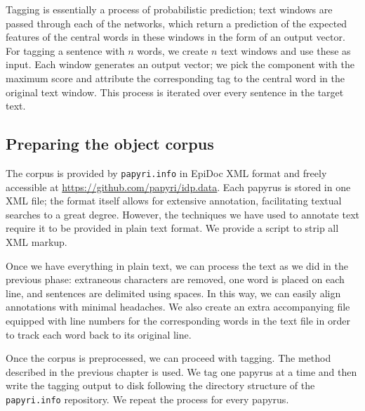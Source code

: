 Tagging is essentially a process of probabilistic prediction; text
windows are passed through each of the networks, which return a
prediction of the expected features of the central words in these
windows in the form of an output vector. For tagging a sentence with
$n$ words, we create $n$ text windows and use these as input. Each
window generates an output vector; we pick the component with the
maximum score and attribute the corresponding tag to the central word
in the original text window. This process is iterated over every
sentence in the target text. 

\subsection{Preparing the object corpus}
\label{sec:createmodel}
The corpus is provided by \texttt{papyri.info} in EpiDoc XML format
and freely accessible at
\url{https://github.com/papyri/idp.data}. Each papyrus is stored in
one XML file; the format itself allows for extensive annotation,
facilitating textual searches to a great degree. However, the
techniques we have used to annotate text require it to be provided in
plain text format. We provide a script to strip all XML markup.

Once we have everything in plain text, we can process the text as we
did in the previous phase: extraneous characters are removed, one word
is placed on each line, and sentences are delimited using spaces. In
this way, we can easily align annotations with minimal headaches. We
also create an extra accompanying file equipped with line numbers for
the corresponding words in the text file in order to track each word
back to its original line.

Once the corpus is preprocessed, we can proceed with tagging. The method
described in the previous chapter is used. We tag one papyrus at a
time and then write the tagging output to disk following the directory
structure of the \texttt{papyri.info} repository. We repeat the process
for every papyrus. 
